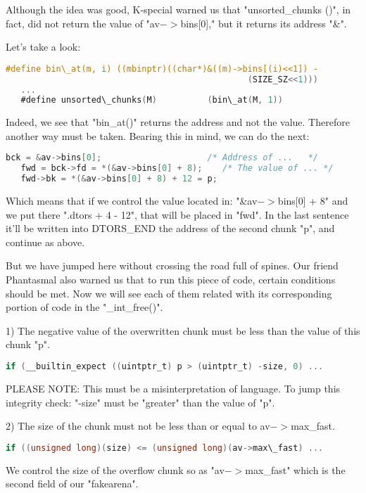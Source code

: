 \documentclass[12pt]{article}
\begin{document}
Although the idea was good, K-special warned us that "unsorted\_chunks ()",
in fact, did not return the value of "av$->$bins[0]," but it returns its
address "\&".
\newline


Let's take a look:
\newline


\begin{lstlisting}[language=C]
   #define bin\_at(m, i) ((mbinptr)((char*)&((m)->bins[(i)<<1]) - 
                                                (SIZE_SZ<<1)))
   ...
   #define unsorted\_chunks(M)          (bin\_at(M, 1))
\end{lstlisting}


Indeed, we see that "bin\_at()" returns the address and not the value.
Therefore another way must be taken. Bearing this in mind, we can do
the next:
\newline


\begin{lstlisting}[language=C]
   bck = &av->bins[0];                     /* Address of ...   */
   fwd = bck->fd = *(&av->bins[0] + 8);    /* The value of ... */
   fwd->bk = *(&av->bins[0] + 8) + 12 = p;
\end{lstlisting}


Which means that if we control the value located in:
"\&av$->$bins[0] + 8" and we put there ".dtors + 4 - 12", that will be
placed in "fwd". In the last sentence it'll be written into DTORS\_END
the address of the second chunk "p", and continue as above.
\newline


But we have jumped here without crossing the road full of spines. Our
friend Phantasmal also warned us that to run this piece of code, certain
conditions should be met. Now we will see each of them related with its
corresponding portion of code in the "\_int\_free()".
\newline


   1) The negative value of the overwritten chunk must
      be less than the value of this chunk "p".
\begin{lstlisting}[language=C]
      if (__builtin_expect ((uintptr_t) p > (uintptr_t) -size, 0) ...
\end{lstlisting}
      PLEASE NOTE: This must be a misinterpretation of language. To jump
                   this integrity check: "-size" must be "greater" than
                   the value of "p".
\newline


   2) The size of the chunk must not be less than or equal to
      av$->$max\_fast.
\begin{lstlisting}[language=C]
      if ((unsigned long)(size) <= (unsigned long)(av->max\_fast) ...
\end{lstlisting}
      We control the size of the overflow chunk so as "av$->$max\_fast"
      which is the second field of our "fakearena".
\newline
\end{document}
